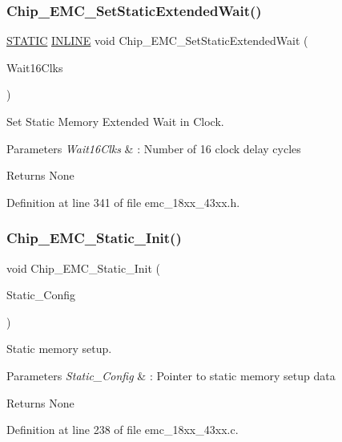 \subsubsection{\texorpdfstring{Chip\+\_\+\+E\+M\+C\+\_\+\+Set\+Static\+Extended\+Wait()}{Chip\_EMC\_SetStaticExtendedWait()}}
{\footnotesize\ttfamily \hyperlink{group___l_p_c___types___public___macros_ga10b2d890d871e1489bb02b7e70d9bdfb}{S\+T\+A\+T\+IC} \hyperlink{spifi__18xx__43xx_8h_a2eb6f9e0395b47b8d5e3eeae4fe0c116}{I\+N\+L\+I\+NE} void Chip\+\_\+\+E\+M\+C\+\_\+\+Set\+Static\+Extended\+Wait (\begin{DoxyParamCaption}\item[{uint32\+\_\+t}]{Wait16\+Clks }\end{DoxyParamCaption})}



Set Static Memory Extended Wait in Clock. 


\begin{DoxyParams}{Parameters}
{\em Wait16\+Clks} & \+: Number of \textquotesingle{}16 clock\textquotesingle{} delay cycles \\
\hline
\end{DoxyParams}
\begin{DoxyReturn}{Returns}
None 
\end{DoxyReturn}


Definition at line 341 of file emc\+\_\+18xx\+\_\+43xx.\+h.

\mbox{\label{group___e_m_c__18_x_x__43_x_x_ga32ea97990abe55ab52630f80f5354f82}} 
\subsubsection{\texorpdfstring{Chip\+\_\+\+E\+M\+C\+\_\+\+Static\+\_\+\+Init()}{Chip\_EMC\_Static\_Init()}}
{\footnotesize\ttfamily void Chip\+\_\+\+E\+M\+C\+\_\+\+Static\+\_\+\+Init (\begin{DoxyParamCaption}\item[{\hyperlink{struct_i_p___e_m_c___s_t_a_t_i_c___c_o_n_f_i_g___t}{I\+P\+\_\+\+E\+M\+C\+\_\+\+S\+T\+A\+T\+I\+C\+\_\+\+C\+O\+N\+F\+I\+G\+\_\+T} $\ast$}]{Static\+\_\+\+Config }\end{DoxyParamCaption})}



Static memory setup. 


\begin{DoxyParams}{Parameters}
{\em Static\+\_\+\+Config} & \+: Pointer to static memory setup data \\
\hline
\end{DoxyParams}
\begin{DoxyReturn}{Returns}
None 
\end{DoxyReturn}


Definition at line 238 of file emc\+\_\+18xx\+\_\+43xx.\+c.

